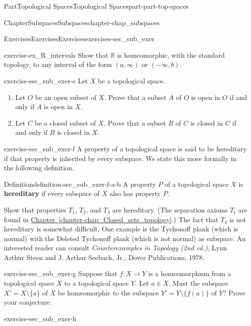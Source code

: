 \documentclass[oneside,10pt,]{book}
\newcommand{\xreffont}{\relax}
\newcommand{\terminology}[1]{\textbf{#1}}
\newcommand{\pubtitle}[1]{\textsl{#1}}
\numberwithin{equation}{chapter}
\newcommand{\R}{\mathbb{R}}
\begin{document}
\begin{partptx}{Part}{Topological Spaces}{}{Topological Spaces}{}{}{part-part-top-spaces}
\begin{chapterptx}{Chapter}{Subspaces}{}{Subspaces}{}{}{chapter-chap_subspaces}
\begin{exercises-section}{Exercises}{Exercises}{}{Exercises}{}{}{exercises-sec_sub_exer}
\begin{divisionexercise}{4}{}{}{exercise-ex_R_intervals}
Show that \(\R\) is homeomorphic, with the standard topology, to any interval of the form \((a,\infty)\) or \((-\infty,b)\).%
\end{divisionexercise}%
\begin{divisionexercise}{5}{}{}{exercise-sec_sub_exer-e}%
Let \(X\) be a topological space.%
\begin{enumerate}[font=\bfseries,label=(\alph*),ref=\alph*]%
\item{}Let \(O\) be an open subset of \(X\). Prove that a subset \(A\) of \(O\) is open in \(O\) if and only if \(A\) is open in \(X\).%
\item{}Let \(C\) be a closed subset of \(X\). Prove that a subset \(B\) of \(C\) is closed in \(C\) if and only if \(B\) is closed in \(X\).%
\end{enumerate}%
\end{divisionexercise}%
\begin{divisionexercise}{6}{}{}{exercise-sec_sub_exer-f}%
A property of a topological space is said to be hereditary if that property is inherited by every subspace. We state this more formally in the following definition.%
\begin{definition}{Definition}{}{definition-sec_sub_exer-f-a-b}%
%
A property \(P\) of a topological space \(X\) is \terminology{hereditary} if every subspace of \(X\) also has property \(P\).%
\end{definition}
Show that properties \(T_1\), \(T_2\), and \(T_3\) are hereditary. (The separation axioms \(T_i\) are found in \hyperref[chapter-chap_Closed_sets_topology]{Chapter~{\xreffont\ref{chapter-chap_Closed_sets_topology}}}.) The fact that \(T_4\) is not hereditary is somewhat difficult. One example is the Tychonoff plank (which is normal) with the Deleted Tychonoff plank (which is not normal) as subspace. An interested reader can consult \pubtitle{Counterexamples in Topology (2nd ed.)}, Lynn Arthur Steen and J. Arthur Seebach, Jr., Dover Publications, 1978.%
\end{divisionexercise}%
\begin{divisionexercise}{7}{}{}{exercise-sec_sub_exer-g}%
Suppose that \(f : X \to Y\) is a homeomorphism from a topological space \(X\) to a topological space \(Y\). Let \(a \in X\). Must the subspace \(X' = X \setminus \{a\}\) of \(X\) be homeomorphic to the subspace \(Y' = Y \setminus \{f(a)\}\) of \(Y\)? Prove your conjecture.%
\end{divisionexercise}%
\begin{divisionexercise}{8}{}{}{exercise-sec_sub_exer-h}%

\end{divisionexercise}
\end{exercises-section}
\end{chapterptx}
\end{partptx}
\end{document}
